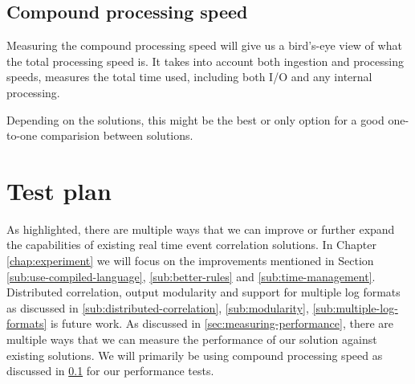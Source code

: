 \subsection{Compound processing speed}
\label{sub:compound-processing-speed}

Measuring the compound processing speed will give us a bird's-eye view of what the total processing speed is. It takes into account both ingestion and processing speeds, measures the total time used, including both I/O and any internal processing.

Depending on the solutions, this might be the best or only option for a good one-to-one comparision between solutions.


\section{Test plan}
As highlighted, there are multiple ways that we can improve or further expand the capabilities of existing real time event correlation solutions. In Chapter \cref{chap:experiment} we will focus on the improvements mentioned in Section \cref{sub:use-compiled-language}, \cref{sub:better-rules} and \cref{sub:time-management}. Distributed correlation, output modularity and support for multiple log formats as discussed in \cref{sub:distributed-correlation}, \cref{sub:modularity}, \cref{sub:multiple-log-formats} is future work.
As discussed in \cref{sec:measuring-performance}, there are multiple ways that we can measure the performance of our solution against existing solutions. We will primarily be using compound processing speed as discussed in \cref{sub:compound-processing-speed} for our performance tests.

